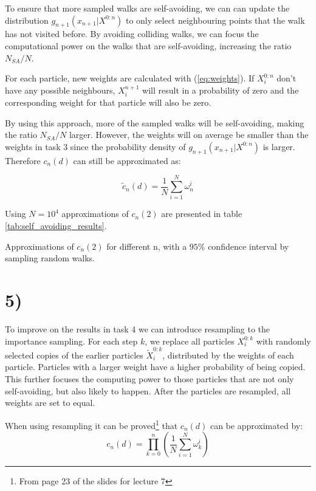 \documentclass[a4paper]{article}
\begin{document}
To ensure that more sampled walks are self-avoiding, we can can update the distribution $g_{n+1}(x_{n+1}|X^{0:n})$ to only select neighbouring points that the walk has not visited before. By avoiding colliding walks, we can focus the computational power on the walks that are self-avoiding, increasing the ratio $N_{SA}/N$. 

For each particle, new weights are calculated with (\ref{eq:weights}). If $X_i^{0:n}$ don't have any possible neighbours, $X_i^{n+1}$ will result in a probability of zero and the corresponding weight for that particle will also be zero.

By using this approach, more of the sampled walks will be self-avoiding, making the ratio $N_{SA}/N$ larger. However, the weights will on average be smaller than the weights in task 3 since the probability density of $g_{n+1}(x_{n+1}|X^{0:n})$ is larger. Therefore $c_n(d)$ can still be approximated as:

\begin{equation}
    \tilde{c}_n(d) = \frac{1}{N}\sum_{i=1}^N\omega_n^i
\end{equation}

Using $N = 10^4$ approximations of $c_n(2)$ are presented in table \ref{tab:self_avoiding_results}.

\begin{table}[H]
    \centering
    \caption{Approximations of $c_n(2)$ for different n, with a $95\%$ confidence interval by sampling random walks.}
    \label{tab:self_avoiding_results}
    
\end{table}

\section*{5)}
To improve on the results in task 4 we can introduce resampling to the importance sampling. For each step $k$, we replace all particles $X_i^{0:k}$ with randomly selected copies of the earlier particles $\widetilde{X}_i^{0:k}$, distributed by the weights of each particle. Particles with a larger weight have a higher probability of being copied. This further focuses the computing power to those particles that are not only self-avoiding, but also likely to happen. After the particles are resampled, all weights are set to equal.

When using resampling it can be proved\footnote{From page 23 of the slides for lecture 7} that $c_n(d)$ can be approximated by:
\begin{equation}
    c_n(d) = \prod_{k = 0}^n(\frac{1}{N}\sum_{i=1}^N\omega_k^i)
\end{equation}
\end{document}
